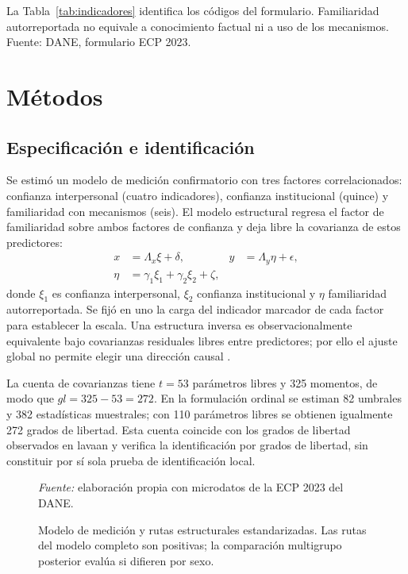 \documentclass[11pt,letterpaper]{article}
\begin{document}

La Tabla~\ref{tab:indicadores} identifica los códigos del formulario. Familiaridad autorreportada no equivale a conocimiento factual ni a uso de los mecanismos. Fuente: DANE, formulario ECP 2023.

\section{Métodos}
\label{sec:metodos}

\subsection{Especificación e identificación}

Se estimó un modelo de medición confirmatorio con tres factores correlacionados: confianza interpersonal (cuatro indicadores), confianza institucional (quince) y familiaridad con mecanismos (seis). El modelo estructural regresa el factor de familiaridad sobre ambos factores de confianza y deja libre la covarianza de estos predictores:
\begin{align}
  x &= \Lambda_x\xi+\delta, & y &= \Lambda_y\eta+\epsilon, \\
  \eta &= \gamma_1\xi_1+\gamma_2\xi_2+\zeta,
\end{align}
donde \(\xi_1\) es confianza interpersonal, \(\xi_2\) confianza institucional y \(\eta\) familiaridad autorreportada. Se fijó en uno la carga del indicador marcador de cada factor para establecer la escala. Una estructura inversa es observacionalmente equivalente bajo covarianzas residuales libres entre predictores; por ello el ajuste global no permite elegir una dirección causal \citep{MacCallum1993}.

La cuenta de covarianzas tiene \(t=53\) parámetros libres y 325 momentos, de modo que \(gl=325-53=272\). En la formulación ordinal se estiman 82 umbrales y 382 estadísticas muestrales; con 110 parámetros libres se obtienen igualmente 272 grados de libertad. Esta cuenta coincide con los grados de libertad observados en lavaan y verifica la identificación por grados de libertad, sin constituir por sí sola prueba de identificación local.

\begin{figure}[htbp]
\centering

\caption{Modelo de medición y rutas estructurales estandarizadas. Las rutas del modelo completo son positivas; la comparación multigrupo posterior evalúa si difieren por sexo. }
\label{fig:modelo}
\smallskip\parbox{\textwidth}{\centering\footnotesize\textit{Fuente:} elaboración propia con microdatos de la ECP 2023 del DANE.}
\end{figure}
\end{document}
